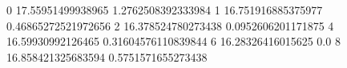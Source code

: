 0 17.55951499938965 1.2762508392333984
1 16.751916885375977 0.46865272521972656
2 16.378524780273438 0.0952606201171875
4 16.59930992126465 0.31604576110839844
6 16.28326416015625 0.0
8 16.858421325683594 0.5751571655273438
